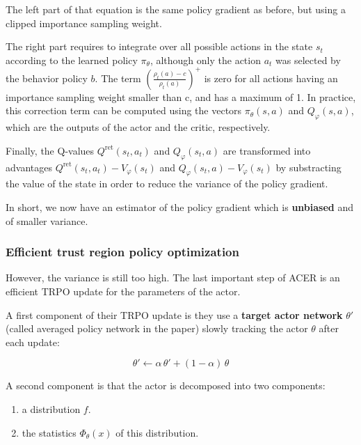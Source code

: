\documentclass[
  letterpaper,
  DIV=11,
  numbers=noendperiod]{scrreprt}
\providecommand{\tightlist}{%
  \setlength{\itemsep}{0pt}\setlength{\parskip}{0pt}}\usepackage{longtable,booktabs,array}
\begin{document}
The left part of that equation is the same policy gradient as before,
but using a clipped importance sampling weight.

The right part requires to integrate over all possible actions in the
state \(s_t\) according to the learned policy \(\pi_\theta\), although
only the action \(a_t\) was selected by the behavior policy \(b\). The
term \((\frac{\rho_t(a) - c}{\rho_t(a)})^+\) is zero for all actions
having an importance sampling weight smaller than c, and has a maximum
of 1. In practice, this correction term can be computed using the
vectors \(\pi_\theta(s, a)\) and \(Q_\varphi(s, a)\), which are the
outputs of the actor and the critic, respectively.

Finally, the Q-values \(Q^\text{ret}(s_t, a_t)\) and
\(Q_\varphi(s_t, a)\) are transformed into advantages
\(Q^\text{ret}(s_t, a_t) - V_\varphi(s_t)\) and
\(Q_\varphi(s_t, a) - V_\varphi(s_t)\) by substracting the value of the
state in order to reduce the variance of the policy gradient.

In short, we now have an estimator of the policy gradient which is
\textbf{unbiased} and of smaller variance.

\hypertarget{efficient-trust-region-policy-optimization}{%
\subsubsection*{Efficient trust region policy
optimization}\label{efficient-trust-region-policy-optimization}}

However, the variance is still too high. The last important step of ACER
is an efficient TRPO update for the parameters of the actor.

A first component of their TRPO update is they use a \textbf{target
actor network} \(\theta'\) (called averaged policy network in the paper)
slowly tracking the actor \(\theta\) after each update:

\[
    \theta' \leftarrow \alpha \, \theta' + (1 - \alpha) \, \theta
\]

A second component is that the actor is decomposed into two components:

\begin{enumerate}
\def\labelenumi{\arabic{enumi}.}
\tightlist
\item
  a distribution \(f\).
\item
  the statistics \(\Phi_\theta(x)\) of this distribution.
\end{enumerate}
\end{document}
